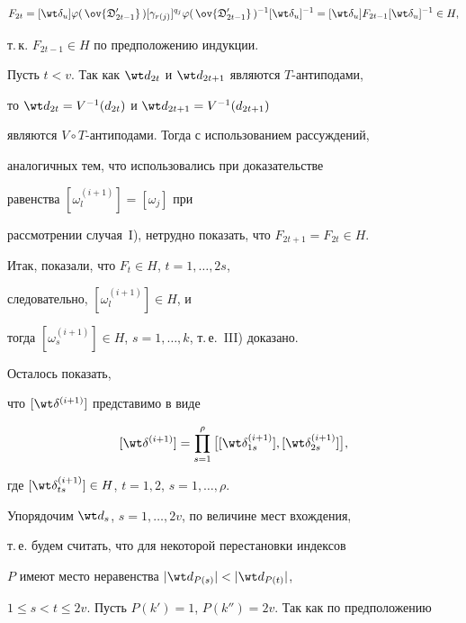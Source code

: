 $$


F_{2t}=[\wt\delta_u]\varphi(\,\ov{{\frak D}'_{2t-1}}\,)


[\gamma_{r(j)}]^{q_j}\varphi(\,\ov{{\frak D}'_{2t-1}}\,)^{-1}


[\wt\delta_u]^{-1}=[\wt\delta_u]F_{2t-1}[\wt\delta_u]^{-1}\in H,


$$


т.\,к. $F_{2t-1}\in H$ по предположению индукции.





Пусть $t<v$. Так как $\wt d_{2t}$ и $\wt d_{2t+1}$ являются $T$-антиподами,


то $\wt d_{2t}=V^{-1}(d_{2t})$ и $\wt d_{2t+1}=V^{-1}(d_{2t+1})$


являются $V\circ T$-антиподами. Тогда с использованием рассуждений, 


аналогичных тем, что использовались при доказательстве


равенства $[\omega^{(i+1)}_l]=[\omega_j]$ при


рассмотрении случая~I), нетрудно показать, что $F_{2t+1}=F_{2t}\in H$.


Итак, показали, что $F_t\in H$, $t=1,\dotsc,2s$,


следовательно, $[\omega^{(i+1)}_l]\in H$, и


тогда $[\omega^{(i+1)}_s]\in H$, $s=1,\dotsc,k$, т.\,е.~III) доказано.





Осталось показать,


что $[\wt\delta^{{(i+1)}}]$ представимо в виде 


$$


[\wt\delta^{(i+1)}]=\prod_{s=1}^\rho


\big[[\wt\delta^{(i+1)}_{1s}],[\wt\delta^{(i+1)}_{2s}]\big],


$$


где $[\wt\delta^{(i+1)}_{ts}]\in H$, $t=1,2$, $s=1,\dotsc,\rho$.





Упорядочим $\wt d_s$, $s=1,\dotsc,2v$, по величине мест вхождения,


т.\,е. будем считать, что для некоторой перестановки индексов


$P$ имеют место неравенства $|\wt d_{P(s)}|<|\wt d_{P(t)}|$,


$1\le s<t\le 2v$. Пусть $P(k')=1$, $P(k'')=2v$. Так как по предположению


